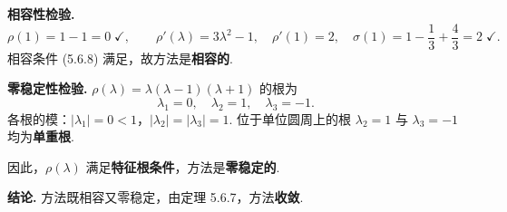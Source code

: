 \documentclass[UTF8,a4paper,11pt]{ctexart}
\begin{document}
\textbf{相容性检验.}\quad
\[
  \rho(1)=1-1=0\;\checkmark,\qquad
  \rho'(\lambda)=3\lambda^2-1,\quad\rho'(1)=2,\quad
  \sigma(1)=1-\frac{1}{3}+\frac{4}{3}=2\;\checkmark.
\]
相容条件 (5.6.8) 满足，故方法是\textbf{相容的}.

\textbf{零稳定性检验.}\quad
$\rho(\lambda)=\lambda(\lambda-1)(\lambda+1)$ 的根为
\[
  \lambda_1=0,\quad\lambda_2=1,\quad\lambda_3=-1.
\]
各根的模：$|\lambda_1|=0<1$，$|\lambda_2|=|\lambda_3|=1$.
位于单位圆周上的根 $\lambda_2=1$ 与 $\lambda_3=-1$ 均为\textbf{单重根}.

因此，$\rho(\lambda)$ 满足\textbf{特征根条件}，方法是\textbf{零稳定的}.

\textbf{结论.}\quad
方法既相容又零稳定，由定理 5.6.7，方法\textbf{收敛}.
\end{document}
